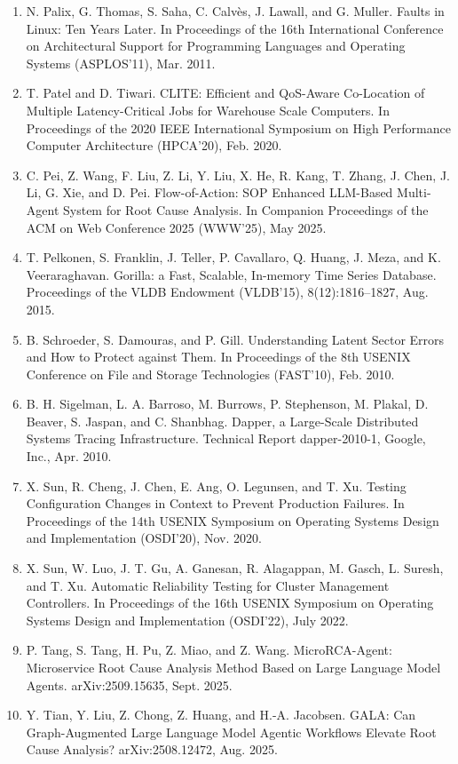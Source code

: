 \documentclass[11pt,UTF8,fontset=fandol]{ctexart}
\begin{document}
\begin{enumerate}[leftmargin=2.2em,labelsep=0.4em,itemsep=0.15em]
\item N. Palix, G. Thomas, S. Saha, C. Calvès, J. Lawall, and G. Muller. Faults in Linux: Ten Years Later. In Proceedings of the 16th International Conference on Architectural Support for Programming Languages and Operating Systems (ASPLOS'11), Mar. 2011.
\item T. Patel and D. Tiwari. CLITE: Efficient and QoS-Aware Co-Location of Multiple Latency-Critical Jobs for Warehouse Scale Computers. In Proceedings of the 2020 IEEE International Symposium on High Performance Computer Architecture (HPCA'20), Feb. 2020.
\item C. Pei, Z. Wang, F. Liu, Z. Li, Y. Liu, X. He, R. Kang, T. Zhang, J. Chen, J. Li, G. Xie, and D. Pei. Flow-of-Action: SOP Enhanced LLM-Based Multi-Agent System for Root Cause Analysis. In Companion Proceedings of the ACM on Web Conference 2025 (WWW'25), May 2025.
\item T. Pelkonen, S. Franklin, J. Teller, P. Cavallaro, Q. Huang, J. Meza, and K. Veeraraghavan. Gorilla: a Fast, Scalable, In-memory Time Series Database. Proceedings of the VLDB Endowment (VLDB'15), 8(12):1816--1827, Aug. 2015.
\item B. Schroeder, S. Damouras, and P. Gill. Understanding Latent Sector Errors and How to Protect against Them. In Proceedings of the 8th USENIX Conference on File and Storage Technologies (FAST'10), Feb. 2010.
\item B. H. Sigelman, L. A. Barroso, M. Burrows, P. Stephenson, M. Plakal, D. Beaver, S. Jaspan, and C. Shanbhag. Dapper, a Large-Scale Distributed Systems Tracing Infrastructure. Technical Report dapper-2010-1, Google, Inc., Apr. 2010.
\item X. Sun, R. Cheng, J. Chen, E. Ang, O. Legunsen, and T. Xu. Testing Configuration Changes in Context to Prevent Production Failures. In Proceedings of the 14th USENIX Symposium on Operating Systems Design and Implementation (OSDI'20), Nov. 2020.
\item X. Sun, W. Luo, J. T. Gu, A. Ganesan, R. Alagappan, M. Gasch, L. Suresh, and T. Xu. Automatic Reliability Testing for Cluster Management Controllers. In Proceedings of the 16th USENIX Symposium on Operating Systems Design and Implementation (OSDI'22), July 2022.
\item P. Tang, S. Tang, H. Pu, Z. Miao, and Z. Wang. MicroRCA-Agent: Microservice Root Cause Analysis Method Based on Large Language Model Agents. arXiv:2509.15635, Sept. 2025.
\item Y. Tian, Y. Liu, Z. Chong, Z. Huang, and H.-A. Jacobsen. GALA: Can Graph-Augmented Large Language Model Agentic Workflows Elevate Root Cause Analysis? arXiv:2508.12472, Aug. 2025.

\end{enumerate}
\end{document}
